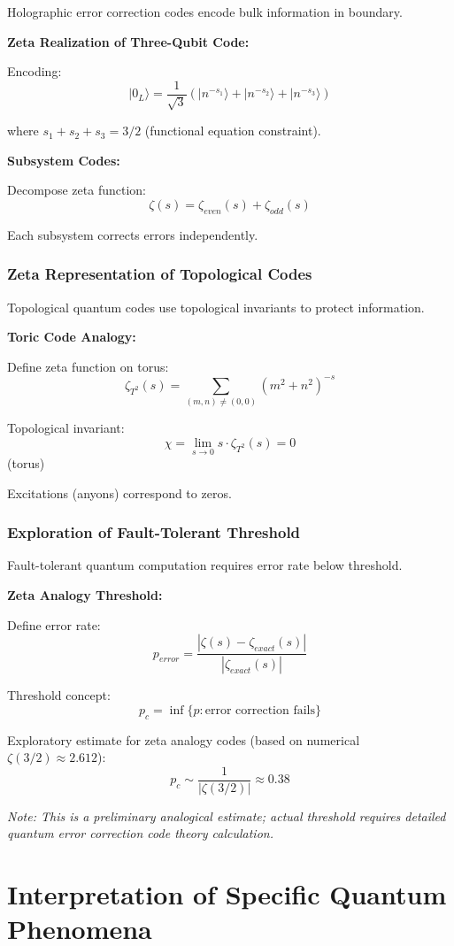 \documentclass[11pt]{article}
\theoremstyle{plain}
\theoremstyle{definition}
\theoremstyle{remark}
\begin{document}
Holographic error correction codes encode bulk information in boundary.

\textbf{Zeta Realization of Three-Qubit Code:}

Encoding:
$$|0_L\rangle = \frac{1}{\sqrt{3}}(|n^{-s_1}\rangle + |n^{-s_2}\rangle + |n^{-s_3}\rangle)$$

where $s_1 + s_2 + s_3 = 3/2$ (functional equation constraint).

\textbf{Subsystem Codes:}

Decompose zeta function:
$$\zeta(s) = \zeta_{even}(s) + \zeta_{odd}(s)$$

Each subsystem corrects errors independently.

\subsubsection{Zeta Representation of Topological Codes}

Topological quantum codes use topological invariants to protect information.

\textbf{Toric Code Analogy:}

Define zeta function on torus:
$$\zeta_{T^2}(s) = \sum_{(m,n) \neq (0,0)} (m^2 + n^2)^{-s}$$

Topological invariant:
$$\chi = \lim_{s \to 0} s \cdot \zeta_{T^2}(s) = 0$$ (torus)

Excitations (anyons) correspond to zeros.

\subsubsection{Exploration of Fault-Tolerant Threshold}

Fault-tolerant quantum computation requires error rate below threshold.

\textbf{Zeta Analogy Threshold:}

Define error rate:
$$p_{error} = \frac{|\zeta(s) - \zeta_{exact}(s)|}{|\zeta_{exact}(s)|}$$

Threshold concept:
$$p_c = \inf\{p: \text{error correction fails}\}$$

Exploratory estimate for zeta analogy codes (based on numerical $\zeta(3/2) \approx 2.612$):
$$p_c \sim \frac{1}{|\zeta(3/2)|} \approx 0.38$$

\textit{Note: This is a preliminary analogical estimate; actual threshold requires detailed quantum error correction code theory calculation.}

\section{Interpretation of Specific Quantum Phenomena}
\end{document}
